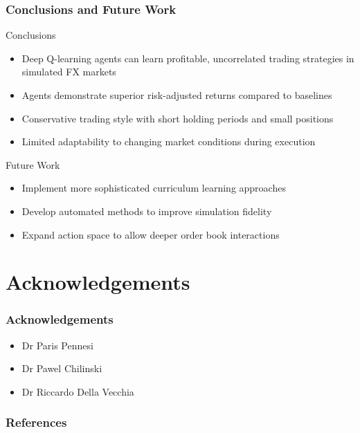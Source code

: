 \documentclass{beamer}
\begin{document}
\begin{frame}
  \frametitle{Conclusions and Future Work}

  \begin{block}{Conclusions}
    \begin{itemize}
      \item Deep Q-learning agents can learn profitable, uncorrelated trading strategies in simulated FX markets
      \item Agents demonstrate superior risk-adjusted returns compared to baselines
      \item Conservative trading style with short holding periods and small positions
      \item Limited adaptability to changing market conditions during execution
    \end{itemize}
  \end{block}

  \begin{block}{Future Work}
    \begin{itemize}
      \item Implement more sophisticated curriculum learning approaches
      \item Develop automated methods to improve simulation fidelity
      \item Expand action space to allow deeper order book interactions
    \end{itemize}
  \end{block}
\end{frame}

\section{Acknowledgements}

\begin{frame}
  \frametitle{Acknowledgements}

  \begin{itemize}
    \item Dr Paris Pennesi
    \item Dr Pawel Chilinski
    \item Dr Riccardo Della Vecchia
  \end{itemize}
\end{frame}

\begin{frame}[allowframebreaks]
  \frametitle{References}
  
  
\end{frame}
\end{document}
